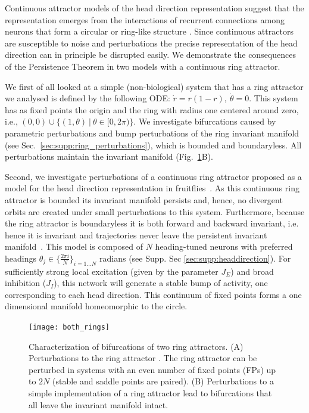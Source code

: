 \documentclass{article} %
\newcounter{ct}
\theoremstyle{definition}
\theoremstyle{remark}
\begin{document}
Continuous attractor models of the head direction representation suggest that the representation emerges from the interactions of recurrent connections among neurons that form a circular or ring-like structure \citep{zhang1996, Noorman2022, ajabi2023}. 
Since continuous attractors are susceptible to noise and perturbations the precise representation of the head direction can in principle be disrupted easily.
We demonstrate the consequences of the Persistence Theorem in two models with a continuous ring attractor.

We first of all looked at a simple (non-biological) system that has a ring attractor we analysed is defined by the following ODE: $\dot r = r(1-r), \ \dot \theta = 0.$
This system has as fixed points the origin and the ring with radius one centered around zero, i.e., $(0,0)\cup\{(1,\theta)\ |\ \theta\in[0,2\pi)\}$. We investigate bifurcations caused by parametric perturbations and bump perturbations of the ring invariant manifold (see Sec.~\ref{sec:supp:ring_perturbations}), which is bounded and boundaryless.
All perturbations maintain the invariant manifold (Fig.~\ref{fig:both_rings}B).

Second, we investigate perturbations of a continuous ring attractor proposed as a model for the head direction representation in fruitflies~\citep{Noorman2022}.
As this continuous ring attractor is bounded its invariant manifold persists and, hence, no divergent orbits are created under small perturbations to this system. 
Furthermore, because the ring attractor is boundaryless it is both forward and backward invariant, i.e. hence it is invariant and trajectories never leave the persistent invariant manifold~\citep{wiggins1994}.
This model is composed of $N$ heading-tuned neurons  with preferred headings $\theta_j \in \{\frac{2\pi i}{N}\}_{i=1\dots N}$ radians (see Supp. Sec \ref{sec:supp:headdirection}).
For sufficiently strong local excitation (given by the parameter $J_E$) and broad inhibition ($J_I$), this network will generate a stable bump of activity, one corresponding to each head direction. This continuum of fixed points forms a one dimensional manifold homeomorphic to the circle. 

\begin{figure}[tbhp]
     \centering
  \texttt{[image: both\_rings]}
       \caption{Characterization of bifurcations of two ring attractors. 
       (A)       Perturbations to the ring attractor \citep{Noorman2022}. The ring attractor can be perturbed in systems with an even number of fixed points (FPs)  up to $2N$ (stable and saddle points are paired). 
       (B) Perturbations to a simple implementation of a ring attractor lead to bifurcations that all leave the invariant manifold intact.
       }
         \label{fig:both_rings}
\end{figure}
\end{document}
